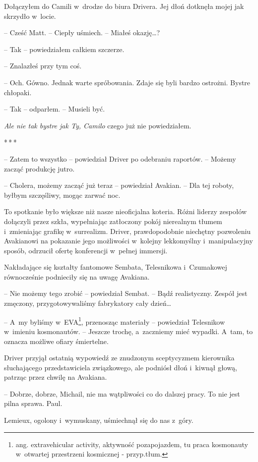 \documentclass[oneside,polish,12pt,sfheadings]{mwbk}
\newcommand{\threeast}{\bigskip\par\centerline{*\,*\,*}\medskip\par}%
\begin{document}
Dołączyłem do Camili w~drodze do biura Drivera. Jej dłoń dotknęła mojej
jak skrzydło w~locie.

-- Cześć Matt. -- Ciepły uśmiech. -- Miałeś okazję\ldots?

-- Tak -- powiedziałem całkiem szczerze. 

-- Znalazłeś przy tym coś. 

-- Och. Gówno. Jednak warte spróbowania. Zdaje się byli bardzo ostrożni. Bystre
chłopaki.

-- Tak -- odparłem. -- Musieli być.

\emph{Ale nie tak bystre jak Ty, Camilo} czego już nie powiedziałem.

\threeast

-- Zatem to wszystko -- powiedział Driver po odebraniu raportów. -- Możemy
zacząć produkcję jutro.

-- Cholera, możemy zacząć już teraz -- powiedział Avakian. -- Dla tej
roboty, byłbym szczęśliwy, mogąc zarwać noc.

To spotkanie było większe niż nasze nieoficjalna koteria. Różni liderzy
zespołów dołączyli przez szkła, wypełniając zatłoczony pokój nierealnym
tłumem i~zmieniając grafikę w~surrealizm. Driver, prawdopodobnie
niechętny pozwoleniu Avakianowi na pokazanie jego możliwości w~kolejny
lekkomyślny i~manipulacyjny sposób, odrzucił ofertę konferencji w~pełnej
immersji.

Nakładające się kształty fantomowe Sembata, Telesnikowa i~Czumakowej
równocześnie podnieciły się na uwagę Avakiana.

-- Nie możemy tego zrobić -- powiedział Sembat. -- Bądź realistyczny.
Zespół jest zmęczony, przygotowywaliśmy fabrykatory cały dzień\ldots

-- A~my byliśmy w~EVA\footnote{ang. extravehicular
activity, aktywność pozapojazdem, tu praca kosmonauty w~otwartej przestrzeni kosmicznej - przyp.tłum.}, przenosząc materiały -- powiedział Telesnikow w~imieniu kosmonautów. -- Jeszcze trochę, a~zaczniemy mieć wypadki. A~tam,
to oznacza możliwe ofiary śmiertelne.

Driver przyjął ostatnią wypowiedź ze znudzonym sceptycyzmem kierownika
słuchającego przedstawiciela związkowego, ale podniósł dłoń i~kiwnął
głową, patrząc przez chwilę na Avakiana.

-- Dobrze, dobrze, Michail, nie ma wątpliwości co do dalszej pracy. To
nie jest pilna sprawa. Paul.

Lemieux, ogolony i~wymuskany, uśmiechnął się do nas z~góry.
\end{document}
